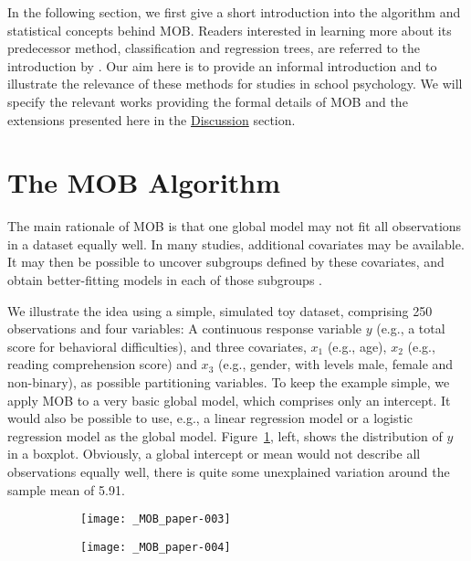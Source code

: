 \documentclass[doc,floatsintext,natbib]{apa7}
\begin{document}
In the following section, we first give a short introduction into the algorithm and statistical concepts behind MOB. Readers interested in learning more about its predecessor method, classification and regression trees, are referred to the introduction by \citet{StrMalTut:2009:PM}. Our aim here is to provide an informal introduction and to illustrate the relevance of these methods for studies in school psychology. We will specify the relevant works providing the formal details of MOB and the extensions presented here in the \hyperref[sec:discussion]{Discussion} section. 

\section{The MOB Algorithm}

The main rationale of MOB is that one global model may not fit all observations in a dataset equally well. In many studies, additional covariates may be available. It may then be possible to uncover subgroups defined by these covariates, and obtain better-fitting models in each of those subgroups \citep{ZeilyHoth08}. 



We illustrate the idea using a simple, simulated toy dataset, comprising 250 observations and four variables: A continuous response variable $y$ (e.g., a total score for behavioral difficulties), and three covariates, $x_1$ (e.g., age), $x_2$ (e.g., reading comprehension score) and $x_3$ (e.g., gender, with levels male, female and non-binary), as possible partitioning variables. To keep the example simple, we apply MOB to a very basic global model, which comprises only an intercept. It would also be possible to use, e.g., a linear regression model or a logistic regression model as the global model. Figure~\ref{fig:toy}, left, shows the distribution of $y$ in a boxplot. Obviously, a global intercept or mean would not describe all observations equally well, there is quite some unexplained variation around the sample mean of 5.91.


\begin{figure}[h]
\caption{Left: Univariate distribution of the response variable. Right: Tree with group-specific distributions of the response variable in the terminal nodes.}
\begin{subfigure}[][][t]{.4\textwidth}
\texttt{[image: \_MOB\_paper-003]}
\end{subfigure}
\begin{subfigure}[][][b]{.7\textwidth}
\texttt{[image: \_MOB\_paper-004]}
\end{subfigure}
\label{fig:toy}
\end{figure}
\end{document}
